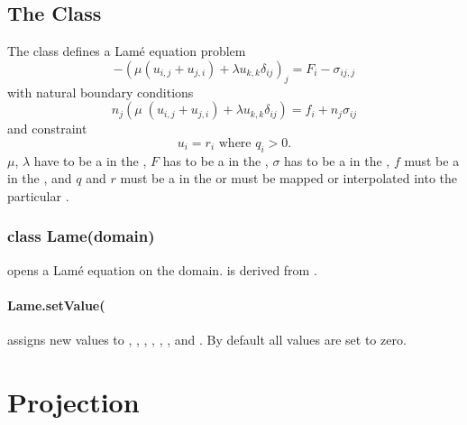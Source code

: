 \subsection{The \Lame Class}
The \Lame class defines a Lam\'e equation problem
\begin{equation}\label{LE.1}
-(\mu (u_{i,j}+u_{j,i})+\lambda u_{k,k}\delta_{ij})_{j} = F_{i}-\sigma_{ij,j}
\end{equation}
with natural boundary conditions
\begin{equation}\label{LE.2}
n_{j}(\mu \; (u_{i,j}+u_{j,i})+\lambda u_{k,k}\delta_{ij}) = f_{i}+n_{j}\sigma_{ij}
\end{equation}
and constraint
\begin{equation}\label{LE.3}
u_{i}=r_{i} \mbox{ where } q_{i}>0 .
\end{equation}
$\mu$, $\lambda$ have to be a \Scalar in the \Function, $F$ has to be a
\Vector in the \Function, $\sigma$ has to be a \Tensor in the \Function,
$f$ must be a \Vector in the \FunctionOnBoundary, and $q$ and $r$ must be a
\Vector in the \SolutionFS or must be mapped or interpolated into the
particular \FunctionSpace.

\subsubsection*{class Lame(domain)}
opens a Lam\'e equation on the \Domain domain. \Lame is derived from \LinearPDE.

\paragraph{Lame.setValue(
     }
assigns new values to , , , ,
, , and . By default all values are set to zero.


\section{Projection}
\label{SEC Projection}

